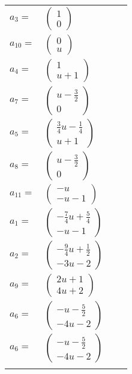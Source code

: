 \documentclass[1p]{elsarticle_modified}
\theoremstyle{definition}
\begin{document}
\begin{tabular}{m{7pt} m{180pt} m{7pt} m{180pt} }
\flushright $a_{3}=$&$\begin{pmatrix}1\\0\end{pmatrix}$ \\
\flushright $a_{10}=$&$\begin{pmatrix}0\\u\end{pmatrix}$ \\
\flushright $a_{4}=$&$\begin{pmatrix}1\\u+1\end{pmatrix}$ \\
\flushright $a_{7}=$&$\begin{pmatrix}u-\frac{3}{2}\\0\end{pmatrix}$ \\
\flushright $a_{5}=$&$\begin{pmatrix}\frac{3}{4} u-\frac{1}{4}\\u+1\end{pmatrix}$ \\
\flushright $a_{8}=$&$\begin{pmatrix}u-\frac{3}{2}\\0\end{pmatrix}$ \\
\flushright $a_{11}=$&$\begin{pmatrix}- u\\- u-1\end{pmatrix}$ \\
\flushright $a_{1}=$&$\begin{pmatrix}-\frac{7}{4} u+\frac{5}{4}\\- u-1\end{pmatrix}$ \\
\flushright $a_{2}=$&$\begin{pmatrix}-\frac{9}{4} u+\frac{1}{2}\\-3 u-2\end{pmatrix}$ \\
\flushright $a_{9}=$&$\begin{pmatrix}2 u+1\\4 u+2\end{pmatrix}$ \\
\flushright $a_{6}=$&$\begin{pmatrix}- u-\frac{5}{2}\\-4 u-2\end{pmatrix}$\\ \flushright $a_{6}=$&$\begin{pmatrix}- u-\frac{5}{2}\\-4 u-2\end{pmatrix}$\\&\end{tabular}
\end{document}
